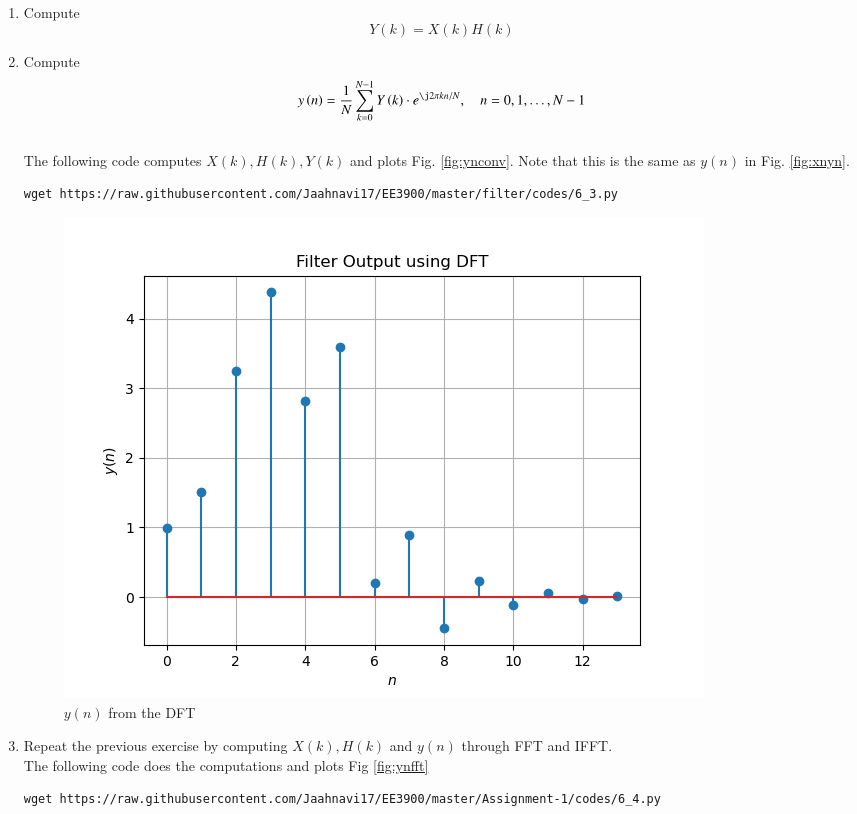 \documentclass[journal,12pt,twocolumn]{IEEEtran}
\renewcommand\thesection{\arabic{section}}
\begin{document}
\begin{enumerate}[label=\thesection.\arabic*]
\item Compute 
\begin{equation}
Y(k) = X(k)H(k)
\end{equation}
\item Compute
\begin{equation}
 y\brak{n}={\frac {1}{N}}\sum _{k=0}^{N-1}Y\brak{k}\cdot e^{\j 2\pi kn/N},\quad n = 0,1,\dots, N-1
\end{equation}
\\
\solution The following code computes $X(k), H(k), Y(k)$ and plots Fig. \ref{fig:ynconv}. Note that this is the same as 
$y(n)$ in  Fig. 
\ref{fig:xnyn}. 
%
\begin{lstlisting}
wget https://raw.githubusercontent.com/Jaahnavi17/EE3900/master/filter/codes/6_3.py
\end{lstlisting}
\begin{figure}[!ht]
\centering
\includegraphics[width=\columnwidth]{./figures/Figure_6}
\caption{$y(n)$ from the DFT}
\label{fig:yndft}
\end{figure}
\item Repeat the previous exercise by computing $X(k), H(k)$ and $y(n)$ through FFT and 
IFFT.\\
\solution The following code does the computations and plots Fig \ref{fig:ynfft}
\begin{lstlisting}
wget https://raw.githubusercontent.com/Jaahnavi17/EE3900/master/Assignment-1/codes/6_4.py
\end{lstlisting}
\begin{figure}[!ht]
\centering

\end{figure}
\end{enumerate}
\end{document}
